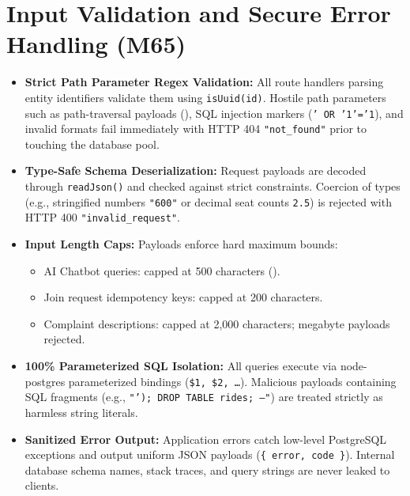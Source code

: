 \documentclass[10pt]{article}
\begin{document}
\section{Input Validation and Secure Error Handling (M65)}
\begin{itemize}
  \item \textbf{Strict Path Parameter Regex Validation:} All route handlers parsing entity identifiers validate them using \texttt{isUuid(id)}. Hostile path parameters such as path-traversal payloads (), SQL injection markers (\texttt{' OR '1'='1}), and invalid formats fail immediately with HTTP 404 \texttt{"not\_found"} prior to touching the database pool.
  \item \textbf{Type-Safe Schema Deserialization:} Request payloads are decoded through \texttt{readJson()} and checked against strict constraints. Coercion of types (e.g., stringified numbers \texttt{"600"} or decimal seat counts \texttt{2.5}) is rejected with HTTP 400 \texttt{"invalid\_request"}.
  \item \textbf{Input Length Caps:} Payloads enforce hard maximum bounds:
    \begin{itemize}
      \item AI Chatbot queries: capped at 500 characters ().
      \item Join request idempotency keys: capped at 200 characters.
      \item Complaint descriptions: capped at 2,000 characters; megabyte payloads rejected.
    \end{itemize}
  \item \textbf{100\% Parameterized SQL Isolation:} All queries execute via node-postgres parameterized bindings (\texttt{\$1, \$2, \dots}). Malicious payloads containing SQL fragments (e.g., \texttt{"'); DROP TABLE rides; --"}) are treated strictly as harmless string literals.
  \item \textbf{Sanitized Error Output:} Application errors catch low-level PostgreSQL exceptions and output uniform JSON payloads (\texttt{\{ error, code \}}). Internal database schema names, stack traces, and query strings are never leaked to clients.
\end{itemize}
\end{document}
